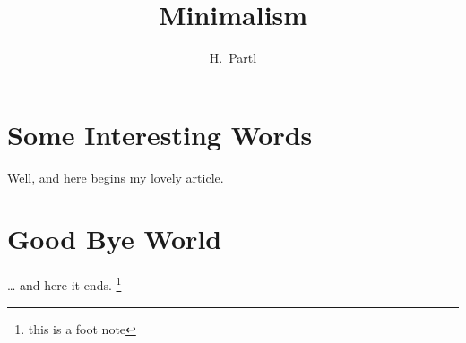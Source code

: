 \documentclass[a4paper,11pt]{article}
\author{H.~Partl}
\title{Minimalism}
\begin{document}
\maketitle
\tableofcontents
\section{Some Interesting Words}
Well, and here begins my lovely article.
\section{Good Bye World}
\ldots{} and here it ends.
\footnote{this is a foot note}

\cite{2018arXiv180400092W}
\end{document}
